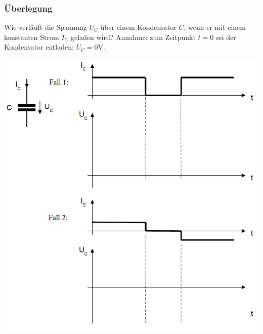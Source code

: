 \subsubsection{Überlegung}
Wie verläuft die Spannung $U_C$ über einem Kondensator $C$, wenn er mit einem konstanten Strom $I_C$ geladen wird? Annahme: zum Zeitpunkt $t=0$ sei der Kondensator entladen: $U_C=0\text{V}$.
\begin{center}
\includegraphics[scale=0.5]{../img/IV/IVe}
\end{center}
